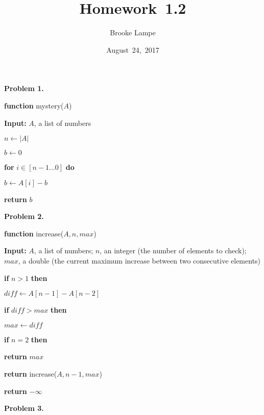 \documentclass{article}
\begin{document}
\title{Homework~1.2}
\author{Brooke Lampe}
\date{August~24,~2017}

\textbf{Problem 1.}

\hspace{0ex}	\textbf{function} mystery($A$)

\hspace{4ex}		\textbf{Input:}  $A$, a list of numbers

\hspace{4ex}		$n \leftarrow |A|$

\hspace{4ex}		$b \leftarrow 0$

\hspace{4ex}		\textbf{for} $i \in [n - 1 ... 0]$ \textbf{do}

\hspace{8ex}			$b \leftarrow A[i] - b$

\hspace{4ex}		\textbf{return} $b$


\textbf{Problem 2.}

\hspace{0ex}	\textbf{function} increase($A, n, max$)

\hspace{4ex}		\textbf{Input:}  $A$, a list of numbers; $n$, an integer (the number of elements to check); $max$, a double (the current maximum increase between two consecutive elements)

\hspace{4ex}		\textbf{if} $n > 1$ \textbf{then}

\hspace{8ex}			$diff \leftarrow A[n - 1] - A[n - 2]$

\hspace{8ex}			\textbf{if} $diff > max$ \textbf{then}

\hspace{12ex}				$max \leftarrow diff$

\hspace{8ex}			\textbf{if} $n = 2$ \textbf{then}

\hspace{12ex}				\textbf{return} $max$

\hspace{8ex}			\textbf{return} increase($A, n - 1, max$)

\hspace{4ex}		\textbf{return} $-\infty$
	
\newpage


\textbf{Problem 3.}
\end{document}
